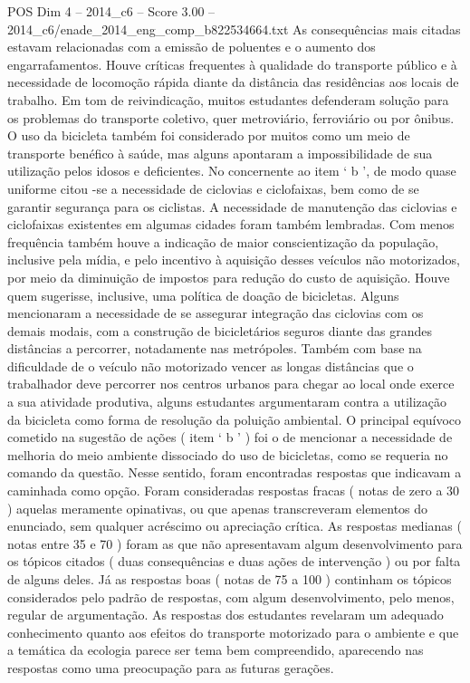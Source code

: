 \begin{textsample}{POS Dim 4 – 2014\_c6 – Score 3.00 – 2014\_c6/enade\_2014\_eng\_comp\_b822534664.txt}
As consequências mais citadas estavam relacionadas com a emissão de poluentes e o aumento dos engarrafamentos.
Houve críticas frequentes à qualidade do transporte público e à necessidade de locomoção rápida diante da distância das residências aos locais de trabalho.
Em tom de reivindicação, muitos estudantes defenderam solução para os problemas do transporte coletivo, quer metroviário, ferroviário ou por ônibus.
O uso da bicicleta também foi considerado por muitos como um meio de transporte benéfico à saúde, mas alguns apontaram a impossibilidade de sua utilização pelos idosos e deficientes.
No concernente ao item ‘ b ’, de modo quase uniforme citou -se a necessidade de ciclovias e ciclofaixas, bem como de se garantir segurança para os ciclistas.
A necessidade de manutenção das ciclovias e ciclofaixas existentes em algumas cidades foram também lembradas.
Com menos frequência também houve a indicação de maior conscientização da população, inclusive pela mídia, e pelo incentivo à aquisição desses veículos não motorizados, por meio da diminuição de impostos para redução do custo de aquisição.
Houve quem sugerisse, inclusive, uma política de doação de bicicletas.
Alguns mencionaram a necessidade de se assegurar integração das ciclovias com os demais modais, com a construção de bicicletários seguros diante das grandes distâncias a percorrer, notadamente nas metrópoles.
Também com base na dificuldade de o veículo não motorizado vencer as longas distâncias que o trabalhador deve percorrer nos centros urbanos para chegar ao local onde exerce a sua atividade produtiva, alguns estudantes argumentaram contra a utilização da bicicleta como forma de resolução da poluição ambiental.
O principal equívoco cometido na sugestão de ações ( item ‘ b ’ ) foi o de mencionar a necessidade de melhoria do meio ambiente dissociado do uso de bicicletas, como se requeria no comando da questão.
Nesse sentido, foram encontradas respostas que indicavam a caminhada como opção.
Foram consideradas respostas fracas ( notas de zero a 30 ) aquelas meramente opinativas, ou que apenas transcreveram elementos do enunciado, sem qualquer acréscimo ou apreciação crítica.
As respostas medianas ( notas entre 35 e 70 ) foram as que não apresentavam algum desenvolvimento para os tópicos citados ( duas consequências e duas ações de intervenção ) ou por falta de alguns deles.
Já as respostas boas ( notas de 75 a 100 ) continham os tópicos considerados pelo padrão de respostas, com algum desenvolvimento, pelo menos, regular de argumentação.
As respostas dos estudantes revelaram um adequado conhecimento quanto aos efeitos do transporte motorizado para o ambiente e que a temática da ecologia parece ser tema bem compreendido, aparecendo nas respostas como uma preocupação para as futuras gerações.

\end{textsample}
